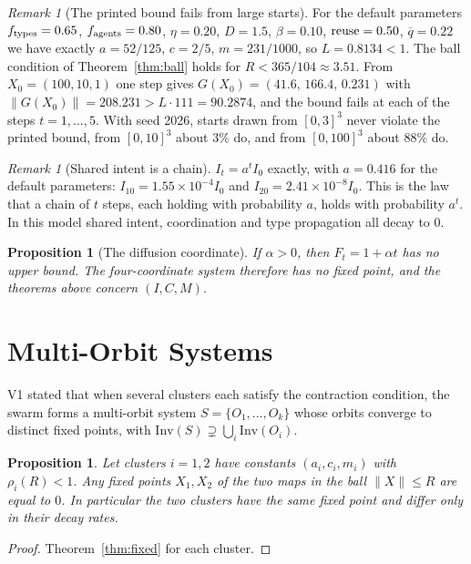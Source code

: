 \documentclass[11pt]{article}
\newtheorem{proposition}[theorem]{Proposition}
\theoremstyle{definition}
\theoremstyle{remark}
\newtheorem{remark}[theorem]{Remark}
\newcommand{\nrm}[1]{\lVert #1\rVert}
\begin{document}
\begin{remark}[The printed bound fails from large starts]\label{rem:fail}
For the default parameters $f_{\rm types}=0.65$, $f_{\rm agents}=0.80$, $\eta=0.20$, $D=1.5$, $\beta=0.10$,
${\rm reuse}=0.50$, $\overline q=0.22$ we have exactly $a=52/125$, $c=2/5$, $m=231/1000$, so $L=0.8134<1$. The
ball condition of Theorem~\ref{thm:ball} holds for $R<365/104\approx3.51$. From $X_0=(100,10,1)$ one step gives
$G(X_0)=(41.6,\,166.4,\,0.231)$ with $\nrm{G(X_0)}=208.231>L\cdot111=90.2874$, and the bound fails at each of
the steps $t=1,\dots,5$. With seed 2026, starts drawn from $[0,3]^3$ never violate the printed bound, from $[0,10]^3$ about $3\%$ do, and
from $[0,100]^3$ about $88\%$ do.
\end{remark}

\begin{remark}[Shared intent is a chain]
$I_t=a^tI_0$ exactly, with $a=0.416$ for the default parameters: $I_{10}=1.55\times10^{-4}I_0$ and
$I_{20}=2.41\times10^{-8}I_0$. This is the law that a chain of $t$ steps, each holding with probability $a$,
holds with probability $a^t$. In this model shared intent, coordination and type propagation all decay to $0$.
\end{remark}

\begin{proposition}[The diffusion coordinate]\label{prop:F}
If $\alpha>0$, then $F_t=1+\alpha t$ has no upper bound. The four-coordinate system therefore has no fixed
point, and the theorems above concern $(I,C,M)$.
\end{proposition}

\section{Multi-Orbit Systems}
V1 stated that when several clusters each satisfy the contraction condition, the swarm forms a multi-orbit
system $S=\{O_1,\dots,O_k\}$ whose orbits converge to distinct fixed points, with $\mathrm{Inv}(S)\supsetneq\bigcup_i\mathrm{Inv}(O_i)$.

\begin{proposition}\label{prop:two}
Let clusters $i=1,2$ have constants $(a_i,c_i,m_i)$ with $\rho_i(R)<1$. Any fixed points $X_1,X_2$ of the two
maps in the ball $\nrm X\le R$ are equal to $0$. In particular the two clusters have the same fixed point and
differ only in their decay rates.
\end{proposition}
\begin{proof}
Theorem~\ref{thm:fixed} for each cluster.
\end{proof}
\end{document}
